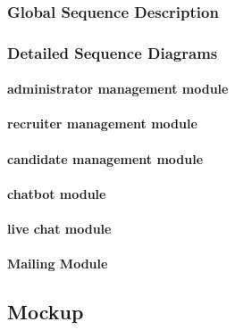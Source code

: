 \subsubsection{Global Sequence Description}
\subsubsection{Detailed Sequence Diagrams}
\paragraph{administrator management module}
\paragraph{recruiter  management module}
\paragraph{candidate  management module}
\paragraph{chatbot module}
\paragraph{live chat module}
\paragraph{Mailing Module}
\subsection{Mockup}
